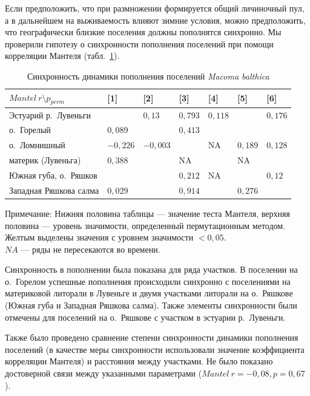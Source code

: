 Если предположить, что при размножении формируется общий личиночный пул, а в дальнейшем на выживаемость влияют зимние условия, можно предположить, что географически близкие поселения должны пополнятся синхронно.
Мы проверили гипотезу о синхронности пополнения поселений при помощи корреляции Мантеля (табл.~\ref{tab:Mantel_dynamic_N1y}).
	\begin{table}[ht]
	\caption{Синхронность динамики пополнения поселений {\it Macoma balthica}}
	\label{tab:Mantel_dynamic_N1y}
        \begin{tabularx}{\textwidth}{|p{}|*{6}{X|}} 
	\hline
	$Mantel \ r \setminus p_{perm}$ & [1] & [2] & [3] & [4] & [5] & [6] \\ \hline
	[1] Эстуарий р.~Лувеньги             &         & $0,13$    & $0,793$      & $0,118$   & \cellcolor{yellow}{$0,001$} & $0,176$ \\ \hline
	[2] о.~Горелый             & $0,089$   &         & $0,413$      & \cellcolor{yellow}{$0,009$}   & \cellcolor{yellow}{$0,004$} & \cellcolor{yellow}{$0,001$} \\ \hline
	[3] о.~Ломнишный          & $-0,226$  & $-0,003$  &            & NA      & $0,189$ & $0,128$ \\ \hline
	[4] материк (Лувеньга)             & $0,388$   & \cellcolor{yellow}{$0,955$}   & NA         &         & NA    & \cellcolor{yellow}{$0,02$}  \\ \hline
	[5] Южная губа, о.~Ряшков                 & \cellcolor{yellow}{$0,793$}   & \cellcolor{yellow}{$0,515$}   & $0,212$      & NA      &       & $0,12$  \\ \hline
	[6] Западная Ряшкова салма                 & $0,029$   & \cellcolor{yellow}{$0,986$}   & $0,914$      & \cellcolor{yellow}{$0,965$}   & $0,276$ &       \\ \hline 
	\end{tabularx}
	   {\footnotesize Примечание: Нижняя половина таблицы --- значение теста Мантеля, верхняя половина --- уровень значимости, определенный пермутационным методом. \\
	Желтым выделены значения с уровнем значимости $< 0,05$. \\
	$NA$ --- ряды не пересекаются во времени.}
	\end{table}
Синхронность в пополнении была показана для ряда участков.
В поселении на о.~Горелом успешные пополнения происходили синхронно с поселениями на материковой литорали в Лувеньге и двумя участками литорали на о.~Ряшкове (Южная губа и Западная Ряшкова салма).
Также элементы синхронности были отмечены для поселений на о.~Ряшкове с участком в эстуарии р.~Лувеньги.

Также было проведено сравнение степени синхронности динамики пополнения поселений (в качестве меры синхронности использовали значение коэффициента корреляции Мантеля) и расстояния между участками.
Не было показано достоверной связи между указанными параметрами ($Mantel\ r = -0,08, p = 0,67$ ).

